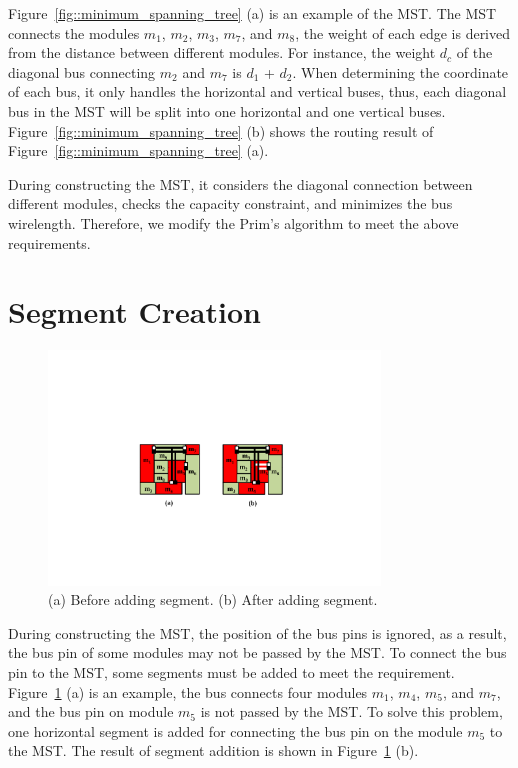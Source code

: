 Figure~\ref{fig::minimum_spanning_tree} (a) is an example of the
MST. The MST connects the modules $m_1$, $m_2$, $m_3$, $m_7$, and
$m_8$, the weight of each edge is derived from the distance
between different modules. For instance, the weight $d_c$ of the diagonal
bus connecting $m_2$ and $m_7$ is $d_1$ + $d_2$. When determining the
coordinate of each bus, it only handles the horizontal and vertical
buses, thus, each diagonal bus in the MST will be split into one
horizontal and one vertical buses.
Figure~\ref{fig::minimum_spanning_tree} (b) shows the routing
result of Figure~\ref{fig::minimum_spanning_tree} (a).

During constructing the MST, it considers the diagonal connection
between different modules, checks the capacity constraint, and
minimizes the bus wirelength. Therefore, we modify the Prim's algorithm to
meet the above requirements.

\section{Segment Creation}
\label{sec::Segment Creation}

\begin{figure}[htb]
  \centering
    \includegraphics[width=8.8cm]{Fig/segment_creation.pdf}
     \caption{
      \small
       (a) Before adding segment. (b) After adding segment.
   }
  \label{fig::segment_creation}
\end{figure}

During constructing the MST, the position of the bus pins is ignored,
as a result, the bus pin of some modules may not be passed by the MST.
To connect the bus pin to the MST, some segments must be added to meet the
requirement. Figure~\ref{fig::segment_creation} (a) is an example, the bus connects four modules $m_1$,
$m_4$, $m_5$, and $m_7$, and the bus pin on module $m_5$ is not passed by the MST.
To solve this problem, one horizontal segment is added for connecting the bus pin on the module $m_5$ to the MST.
The result of segment addition is shown in Figure~\ref{fig::segment_creation} (b).

